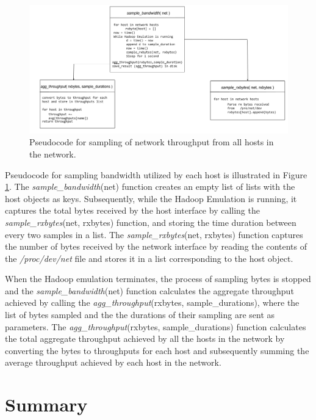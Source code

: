 \begin{figure}[!ht] 
	\centerline{\includegraphics[scale=0.40]{graphics/chapter5/SamplingPseudocode.png}}
	\caption{Pseudocode for sampling of network throughput from all hosts in the network.}
	\label{fig:SamplingPseudocode}
\end{figure}

Pseudocode for sampling bandwidth utilized by each host is illustrated in Figure \ref{fig:SamplingPseudocode}. The \textit{sample\_bandwidth}(net) function creates an empty list of lists with the host objects as keys. Subsequently, while the Hadoop Emulation is running, it captures the total bytes received by the host interface by calling the \textit{sample\_rxbytes}(net, rxbytes) function, and storing the time duration between every two samples in a list. The \textit{sample\_rxbytes}(net, rxbytes) function captures the number of bytes received by the network interface by reading the contents of the \textit{/proc/dev/net} file and stores it in a list corresponding to the host object. 

When the Hadoop emulation terminates, the process of sampling bytes is stopped and the \textit{sample\_bandwidth}(net) function calculates the aggregate throughput achieved by calling the \textit{agg\_throughput}(rxbytes, sample\_durations), where the list of bytes sampled and the the durations of their sampling are sent as parameters. The \textit{agg\_throughput}(rxbytes, sample\_durations) function calculates the total aggregate throughput achieved by all the hosts in the network by converting the bytes to throughputs for each host and subsequently summing the average throughput achieved by each host in the network. 

\section{Summary} \label{sec:ImplSummary}

